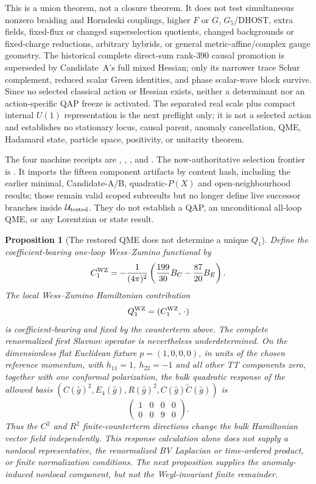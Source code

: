 \documentclass[11pt]{article}
\newtheorem{proposition}[theorem]{Proposition}
\theoremstyle{definition}
\theoremstyle{remark}
\begin{document}
This is a union theorem, not a closure theorem.  It does not test simultaneous
nonzero braiding and Horndeski couplings, higher $F$ or $G$, $G_5$/DHOST,
extra fields, fixed-flux or changed superselection quotients, changed
backgrounds or fixed-charge reductions, arbitrary hybrids, or general
metric-affine/complex gauge geometry.  The historical complete direct-sum
rank-$390$ causal promotion is superseded by Candidate~A's full mixed
Hessian; only its narrower trace Schur complement, reduced scalar Green
identities, and phase scalar-wave block survive.  Since no selected classical
action or Hessian exists, neither a determinant nor an action-specific QAP
freeze is activated.  The separated real scale plus compact internal $U(1)$
representation is the next preflight only; it is not a selected action and
establishes no stationary locus, causal parent, anomaly cancellation, QME,
Hadamard state, particle space, positivity, or unitarity theorem.

The four machine receipts are
,
,
, and
.
The now-authoritative selection frontier is
.  It imports the
fifteen component artifacts by content hash, including the earlier minimal,
Candidate-A/B, quadratic-$P(X)$ and open-neighbourhood results; those remain
valid scoped subresults but no longer define live successor branches inside
$\mathcal U_{\rm tested}$.
They do not establish a QAP, an unconditional all-loop QME, or any
Lorentzian or state result.

\begin{proposition}[The restored QME does not determine a unique $Q_1$]
Define the coefficient-bearing one-loop Wess--Zumino functional by
\[
 C_1^{\rm WZ}=-\frac1{(4\pi)^2}
 \left(\frac{199}{30}B_C-\frac{87}{20}B_E\right).
\]
The local Wess--Zumino Hamiltonian contribution
\[
 Q_1^{\rm WZ}=(C_1^{\rm WZ},\,\cdot)
\]
is coefficient-bearing and fixed by the counterterm above.  The complete
renormalized first Slavnov operator is nevertheless underdetermined.  On the
dimensionless flat Euclidean fixture $p=(1,0,0,0)$, in units of the chosen
reference momentum, with $h_{11}=1$, $h_{22}=-1$ and all other TT components
zero, together with one conformal polarization, the bulk quadratic response
of the allowed basis
$(C(\widehat g)^2,E_4(\widehat g),R(\widehat g)^2,
C(\widehat g)\widetilde C(\widehat g))$ is
\[
 \begin{pmatrix}1&0&0&0\\0&0&9&0\end{pmatrix}.
\]
Thus the $C^2$ and $R^2$ finite-counterterm directions change the bulk
Hamiltonian vector field independently.  This response calculation alone
does not supply a nonlocal representative, the renormalized BV Laplacian or
time-ordered product, or finite normalization conditions.  The next
proposition supplies the anomaly-induced nonlocal component, but not the
Weyl-invariant finite remainder.
\end{proposition}
\end{document}

